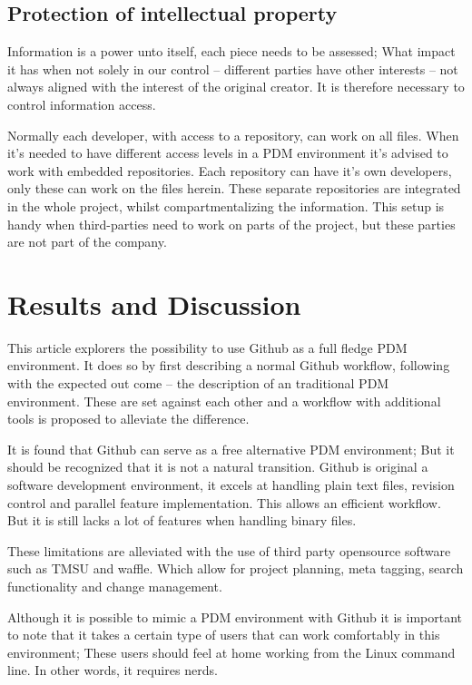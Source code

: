 \documentclass[fleqn,10pt]{SelfArx} %
\begin{document}
\subsection{Protection of intellectual property}
Information is a power unto itself, each piece needs to be assessed; What impact it has when not solely in our control -- different parties have other interests -- not always aligned with the interest of the original creator. It is therefore necessary to control information access. 

Normally each developer, with access to a repository, can work on all files. When it's needed to have different access levels in a PDM environment it's advised to work with embedded repositories. Each repository can have it's own developers, only these can work on the files herein. These separate repositories are integrated in the whole project, whilst compartmentalizing the information. This setup is handy when third-parties need to work on parts of the project, but these parties are not part of the company. 

\section{Results and Discussion} \label{sec:discussion}
This article explorers the possibility to use Github as a full fledge PDM environment. It does so by first describing a normal Github workflow, following with the expected out come -- the description of an traditional PDM environment. These are set against each other and a workflow with additional tools is proposed to alleviate the difference.

It is found that Github can serve as a free alternative PDM environment; But it should be recognized that it is not a natural transition. Github is original a software development environment, it excels at handling plain text files, revision control and parallel feature implementation. This allows an efficient workflow. But it is still lacks a lot of features when handling binary files. 

These limitations are alleviated with the use of third party opensource software such as TMSU and waffle. Which allow for project planning, meta tagging, search functionality and change management.

Although it is possible to mimic a PDM environment with Github it is important to note that it takes a certain type of users that can work comfortably in this environment; These users should feel at home working from the Linux command line. In other words, it requires nerds. 
\end{document}
